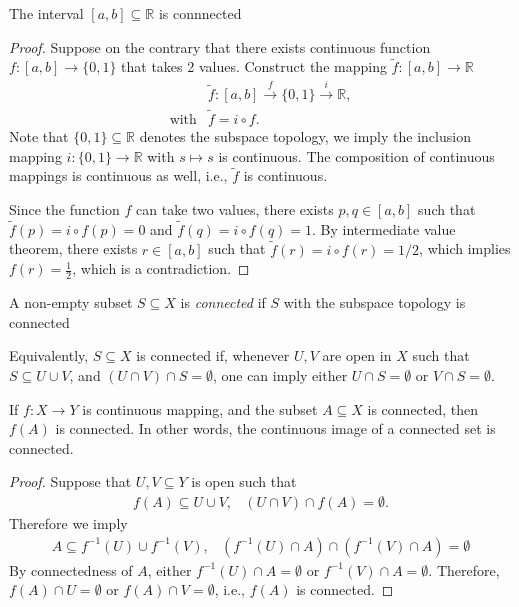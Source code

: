 \begin{corollary}
The interval $[a,b]\subseteq\mathbb{R}$ is connnected
\end{corollary}
\begin{proof}
Suppose on the contrary that there exists continuous function $f:[a,b]\to\{0,1\}$ that takes 2 values. Construct the mapping $\tilde f:[a,b]\to\mathbb{R}$
\[
\begin{array}{ll}
&\tilde f:
[a,b]
\xrightarrow{f}\{0,1\}
\xrightarrow{i}
\mathbb{R},\\
\text{with}&\tilde{f} = i\circ f.
\end{array}
\]
Note that $\{0,1\}\subseteq \mathbb{R}$ denotes the subspace topology, we imply the inclusion mapping $i:\{0,1\}\to \mathbb{R}$ with $s\mapsto s$ is continuous. The composition of continuous mappings is continuous as well, i.e., $\tilde{f}$ is continuous.

Since the function $f$ can take two values, there exists $p,q\in[a,b]$ such that $\tilde{f}(p)=i\circ f(p)=0$ and $\tilde{f}(q)=i\circ f(q)=1$. 
By intermediate value theorem, there exists $r\in[a,b]$ such that 
$\tilde f(r) = i\circ f(r)=1/2$, which implies $f(r)=\frac{1}{2}$, which is a contradiction.
\end{proof}

\begin{definition}
A non-empty subset $S\subseteq X$ is \emph{connected} if 
$S$ with the subspace topology is connected 

Equivalently, $S\subseteq X$ is connected if,
whenever $U,V$ are open in $X$ such that $S\subseteq U\cup V$, and 
$
(U\cap V)\cap S=\emptyset
$, one can imply either $U\cap S=\emptyset$ or $V\cap S=\emptyset$.
\end{definition}

\begin{proposition}\label{pro:4:9}
If $f:X\to Y$ is continuous mapping, and the subset $A\subseteq X$ is connected, then $f(A)$ is connected. 
In other words, the continuous image of a connected set is connected.
\end{proposition}

\begin{proof}
Suppose that $U,V\subseteq Y$ is open such that
\[
\begin{array}{ll}
f(A)\subseteq U\cup V,
&
(U\cap V)\cap f(A)=\emptyset.
\end{array}
\]
Therefore we imply 
\[
\begin{array}{ll}
A\subseteq f^{-1}(U)\cup f^{-1}(V),
&
(f^{-1}(U)\cap A)\cap(f^{-1}(V)\cap A)=\emptyset
\end{array}
\]
By connectedness of $A$, either $f^{-1}(U)\cap A=\emptyset$ or $f^{-1}(V)\cap A=\emptyset$. 
Therefore, $f(A)\cap U=\emptyset$ or $f(A)\cap V=\emptyset$, i.e., $f(A)$ is connected.
\end{proof}

